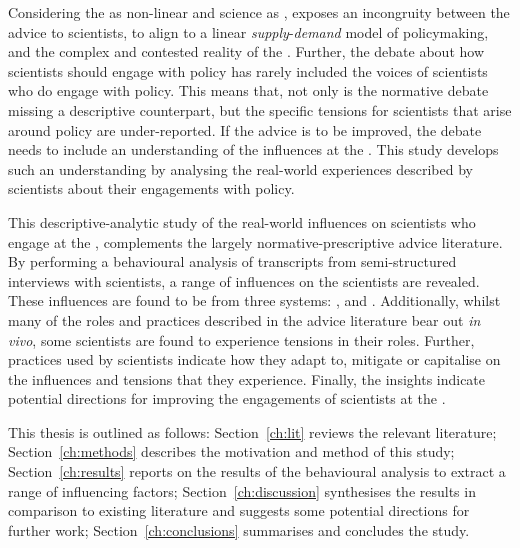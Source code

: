 Considering the \SPI{} as non-linear and \CAN{} science as \PNS, exposes an incongruity between the advice to scientists, to align to a linear \emph{supply}-\emph{demand} model of policymaking, and the complex and contested reality of the \CAN{} \SPI. Further, the debate about how scientists should engage with policy has rarely included the voices of scientists who do engage with policy. This means that, not only is the normative debate missing a descriptive counterpart, but the specific tensions for scientists that arise around \CAN{} policy are under-reported. If the advice is to be improved, the debate needs to include an understanding of the influences at the \CAN{} \SPI. This study develops such an understanding by analysing the real-world experiences described by \CAN{} scientists about their engagements with policy.

This descriptive-analytic study of the real-world influences on scientists who engage at the \CAN{} \SPI, complements the largely normative-prescriptive advice literature. By performing a behavioural analysis of transcripts from semi-structured interviews with scientists, a range of influences on the scientists are revealed. These influences are found to be from three systems: \inte, \know{} and \scip. Additionally, whilst many of the roles and practices described in the advice literature bear out \emph{in vivo}, some scientists are found to experience tensions in their roles. Further, practices used by scientists indicate how they adapt to, mitigate or capitalise on the influences and tensions that they experience. Finally, the insights indicate potential directions for improving the engagements of scientists at the \CAN{} \SPI.

This thesis is outlined as follows: Section~\ref{ch:lit} reviews the relevant literature; Section~\ref{ch:methods} describes the motivation and method of this study; Section~\ref{ch:results} reports on the results of the behavioural analysis to extract a range of influencing factors; Section~\ref{ch:discussion} synthesises the results in comparison to existing literature and suggests some potential directions for further work; Section~\ref{ch:conclusions} summarises and concludes the study.

